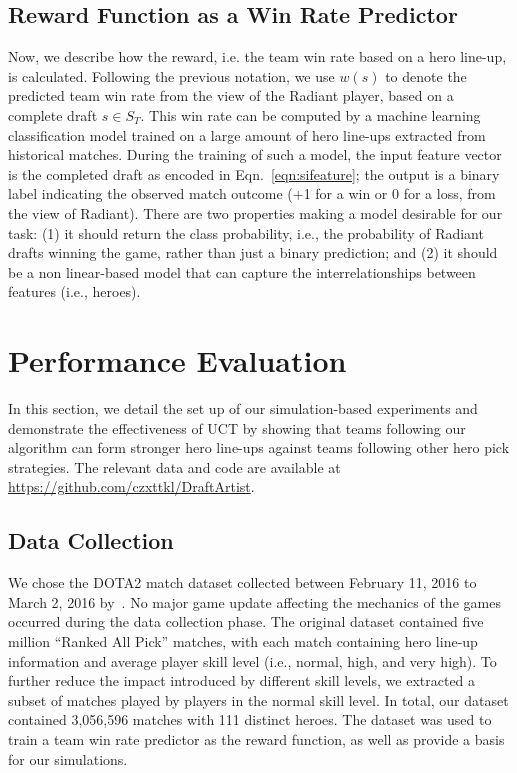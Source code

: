 \subsection{Reward Function as a Win Rate Predictor}\label{sec:rewardfunction}
Now, we describe how the reward, i.e. the team win rate based on a hero line-up, is calculated. Following the previous notation, we use $w(s)$ to denote the predicted team win rate from the view of the Radiant player, based on a complete draft $s \in S_T$. This win rate can be computed by a machine learning classification model trained on a large amount of hero line-ups extracted from historical matches. During the training of such a model, the input feature vector is the completed draft as encoded in Eqn.~\ref{eqn:sifeature}; the output is a binary label indicating the observed match outcome (+1 for a win or 0 for a loss, from the view of Radiant). There are two properties making a model desirable for our task: (1) it should return the class probability, i.e., the probability of Radiant drafts winning the game, rather than just a binary prediction; and (2) it should be a non linear-based model that can capture the interrelationships between features (i.e., heroes). 


\section{Performance Evaluation}\label{ressection}
In this section, we detail the set up of our simulation-based experiments and demonstrate the effectiveness of UCT by showing that teams following our algorithm can form stronger hero line-ups against teams following other hero pick strategies. The relevant data and code are available at \url{https://github.com/czxttkl/DraftArtist}.

\subsection{Data Collection}
We chose the DOTA2 match dataset collected between February 11, 2016 to March 2, 2016 by~\textcite{Semenov2016}. No major game update affecting the mechanics of the games occurred during the data collection phase. The original dataset contained five million ``Ranked All Pick'' matches, with each match containing hero line-up information and average player skill level (i.e., normal, high, and very high). To further reduce the impact introduced by different skill levels, 
we extracted a subset of matches played by players in the normal skill level. In total, our dataset contained 3,056,596 matches with 111 distinct heroes. The dataset was used to train a team win rate predictor as the reward function, as well as provide a basis for our simulations.

